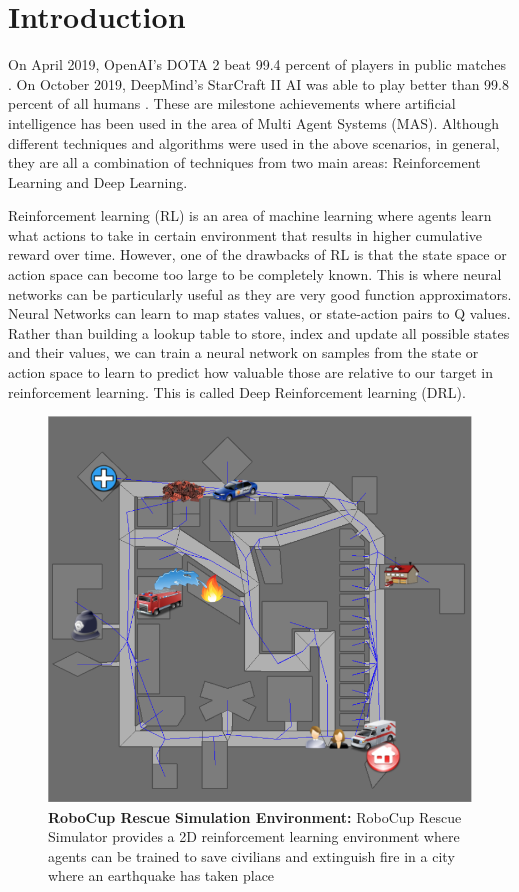 \documentclass[12pt]{report}
\begin{document}
%
\listoffigures
\newpage
{}%
\listofalgorithms
\newpage
{}%
\listoftables
\newpage

\chapter{Introduction}            

On April 2019, OpenAI's DOTA 2 beat 99.4 percent of players in public matches \cite{dota2}. On October 2019, DeepMind's StarCraft II AI was able to play better than 99.8 percent of all humans \cite{Starcraft2}. These are milestone achievements where artificial intelligence has been used in the area of Multi Agent Systems (MAS). Although different techniques and algorithms were used in the above scenarios, in general, they are all a combination of techniques from two main areas: Reinforcement Learning and Deep Learning. 

Reinforcement learning (RL) is an area of machine learning where agents learn what actions to take in certain environment that results in higher cumulative reward over time. However, one of the drawbacks of RL is that the state space or action space can become too large to be completely known. This is where neural networks can be particularly useful as they are very good function approximators. Neural Networks can learn to map states values, or state-action pairs to Q values. Rather than building a lookup table to store, index and update all possible states and their values, we can train a neural network on samples from the state or action space to learn to predict how valuable those are relative to our target in reinforcement learning. This is called Deep Reinforcement learning (DRL). 

\begin{figure}[!h]
    \centering
    \includegraphics[width=12cm]{10.png}
    \caption{\textbf{RoboCup Rescue Simulation Environment:} RoboCup Rescue Simulator provides a 2D reinforcement learning environment where agents can be trained to save civilians and extinguish fire in a city where an earthquake has taken place}
    \label{fig:10}
\end{figure}
\end{document}
